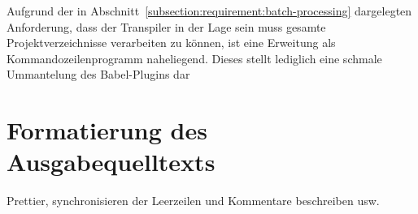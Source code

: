 Aufgrund der in Abschnitt~\ref{subsection:requirement:batch-processing} dargelegten Anforderung, dass der Transpiler in der Lage sein muss gesamte Projektverzeichnisse  verarbeiten zu können, ist eine Erweitung als Kommandozeilenprogramm naheliegend.
Dieses stellt lediglich eine schmale Ummantelung des Babel-Plugins dar



\section{Formatierung des Ausgabequelltexts}

  Prettier, synchronisieren der Leerzeilen und Kommentare beschreiben usw.
